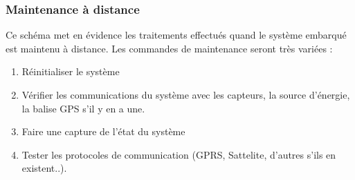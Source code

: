             \subsubsection{Maintenance à distance}
Ce schéma met en évidence les traitements effectués quand le système embarqué est maintenu à distance. Les commandes de maintenance seront 
très variées :
\begin{enumerate}
       \item Réinitialiser le système
       \item Vérifier les communications du système avec les capteurs, la source d'énergie, la balise GPS s'il y en a une.
       \item Faire une capture de l'état du système
       \item Tester les protocoles de communication (GPRS, Sattelite, d'autres s'ils en existent..).
 \end{enumerate}
